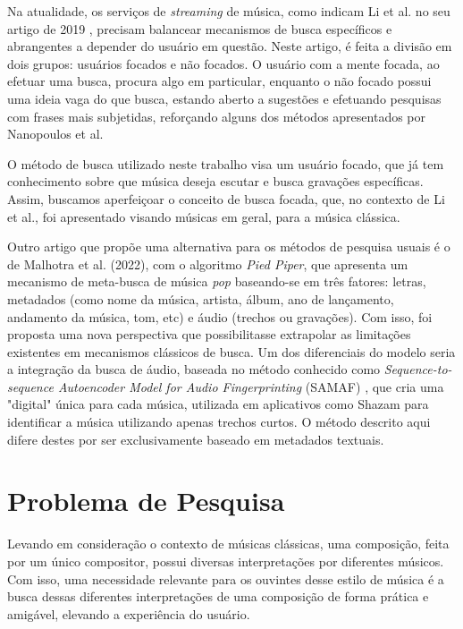 \documentclass[12pt]{article}
\begin{document}
Na atualidade, os serviços de \emph{streaming} de música, como indicam Li et al. no seu
artigo de 2019 \cite{LiThChToGa:19}, precisam balancear mecanismos de busca específicos
e abrangentes a depender do usuário em questão.
Neste artigo, é feita a divisão em dois grupos: usuários focados e não focados.
O usuário com a mente focada, ao efetuar uma busca, procura algo em particular,
enquanto o não focado possui uma ideia vaga do que busca, estando aberto a
sugestões e efetuando pesquisas com frases mais subjetidas, reforçando alguns
dos métodos apresentados por Nanopoulos et al.

O método de busca utilizado neste trabalho visa um usuário focado, que já tem
conhecimento sobre que música deseja escutar e busca gravações específicas.
Assim, buscamos aperfeiçoar o conceito de busca focada, que, no contexto de Li et al.,
foi apresentado visando músicas em geral, para a música clássica.

Outro artigo que propõe uma alternativa para os métodos de pesquisa
usuais é o de Malhotra et al. (2022), com o algoritmo \emph{Pied Piper},
que apresenta um mecanismo de meta-busca de música \emph{pop} baseando-se em
três fatores: letras, metadados (como nome da música, artista, álbum, ano de
lançamento, andamento da música, tom, etc) e áudio (trechos ou gravações).
Com isso, foi proposta uma nova perspectiva que possibilitasse extrapolar as
limitações existentes em mecanismos clássicos de busca. Um dos diferenciais do
modelo seria a integração da busca de áudio, baseada no método conhecido como
\emph{Sequence-to-sequence Autoencoder Model for Audio Fingerprinting} (SAMAF)
\cite{Ba+:20}, que cria uma "digital" única para cada música, utilizada
em aplicativos como Shazam para identificar a música utilizando apenas trechos
curtos.
O método descrito aqui difere destes por ser exclusivamente baseado em metadados
textuais.

\section{Problema de Pesquisa} \label{sec:problem}

Levando em consideração o contexto de músicas clássicas, uma composição, feita
por um único compositor, possui diversas interpretações por diferentes músicos.
Com isso, uma necessidade relevante para os ouvintes desse estilo de música é a
busca dessas diferentes interpretações de uma composição de forma prática e
amigável, elevando a experiência do usuário.
\end{document}
